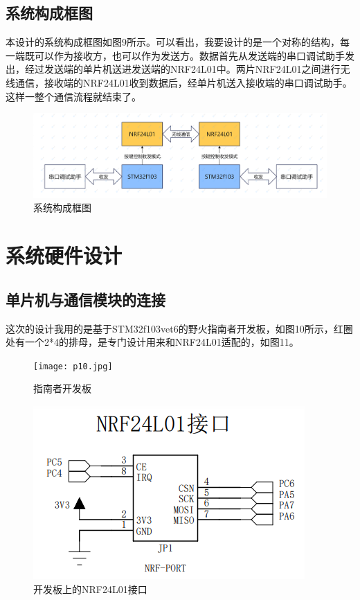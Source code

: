 \documentclass[UTF8,a4paper,11pt]{article}
\begin{document}
\subsection{系统构成框图}
本设计的系统构成框图如图9所示。可以看出，我要设计的是一个对称的结构，每一端既可以作为接收方，也可以作为发送方。数据首先从发送端的串口调试助手发出，经过发送端的单片机送进发送端的NRF24L01中。两片NRF24L01之间进行无线通信，接收端的NRF24L01收到数据后，经单片机送入接收端的串口调试助手。这样一整个通信流程就结束了。
\begin{figure}[htbp]
    \centering
    \includegraphics[scale=0.1]{p8.png}
    \caption{系统构成框图}
\end{figure} 
\clearpage

\section{系统硬件设计}
\subsection{单片机与通信模块的连接}
这次的设计我用的是基于STM32f103vet6的野火指南者开发板，如图10所示，红圈处有一个2*4的排母，是专门设计用来和NRF24L01适配的，如图11。

\begin{figure}[htbp]
    \centering
    \texttt{[image: p10.jpg]}
    \caption{指南者开发板}
\end{figure} 

\begin{figure}[htbp]
    \centering
    \includegraphics{p11.png}
    \caption{开发板上的NRF24L01接口}
\end{figure} 
\end{document}
